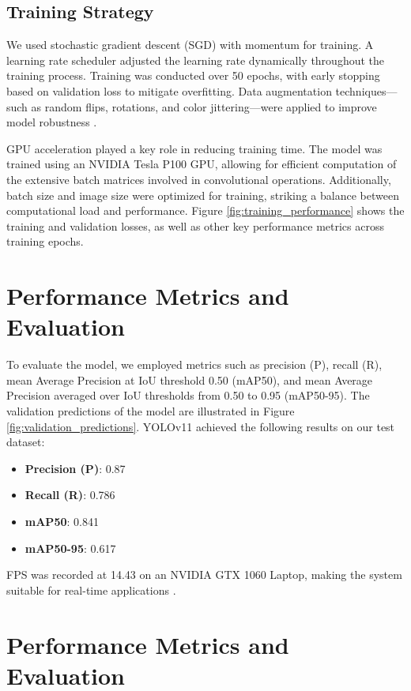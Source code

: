 \documentclass[12pt]{article}
\begin{document}
\subsection{Training Strategy}
We used stochastic gradient descent (SGD) with momentum for training. A learning rate scheduler adjusted the learning rate dynamically throughout the training process. Training was conducted over 50 epochs, with early stopping based on validation loss to mitigate overfitting. Data augmentation techniques—such as random flips, rotations, and color jittering—were applied to improve model robustness \cite{li2022real}.

GPU acceleration played a key role in reducing training time. The model was trained using an NVIDIA Tesla P100 GPU, allowing for efficient computation of the extensive batch matrices involved in convolutional operations. Additionally, batch size and image size were optimized for training, striking a balance between computational load and performance. Figure \ref{fig:training_performance} shows the training and validation losses, as well as other key performance metrics across training epochs.

\section{Performance Metrics and Evaluation}

To evaluate the model, we employed metrics such as precision (P), recall (R), mean Average Precision at IoU threshold 0.50 (mAP50), and mean Average Precision averaged over IoU thresholds from 0.50 to 0.95 (mAP50-95). The validation predictions of the model are illustrated in Figure \ref{fig:validation_predictions}. YOLOv11 achieved the following results on our test dataset:

\begin{itemize}
    \item \textbf{Precision (P)}: 0.87
    \item \textbf{Recall (R)}: 0.786
    \item \textbf{mAP50}: 0.841
    \item \textbf{mAP50-95}: 0.617
\end{itemize}

FPS was recorded at 14.43 on an NVIDIA GTX 1060 Laptop, making the system suitable for real-time applications \cite{ashraf2024v}.

\section{Performance Metrics and Evaluation}
\end{document}

